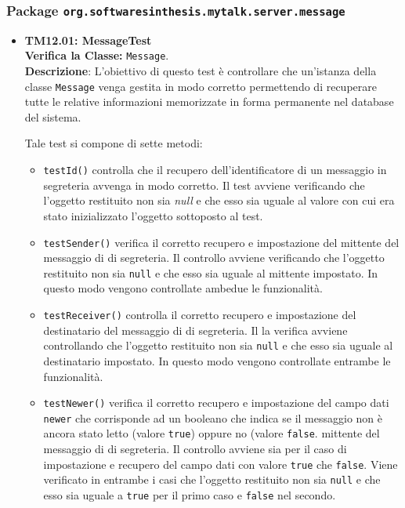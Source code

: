 \subsubsection{Package \texttt{org.softwaresinthesis.mytalk.server.message}}
\begin{itemize}

\item \textbf{TM12.01: MessageTest}\\
\textbf{Verifica la Classe:} \texttt{Message}.\\
\textbf{Descrizione}: L'obiettivo di questo test è controllare che un'istanza della classe  \texttt{Message} venga gestita in modo corretto permettendo di recuperare tutte le relative informazioni memorizzate in forma permanente nel database del sistema.

Tale test si compone di sette metodi:
\begin{itemize}
\item \texttt{testId()} controlla che il recupero dell'identificatore di un messaggio in segreteria avvenga in modo corretto. 
Il test avviene verificando che l'oggetto restituito non sia \textit{null} e che esso sia uguale al valore con cui era stato inizializzato l'oggetto sottoposto al test.
\item \texttt{testSender()} verifica il corretto recupero e impostazione del mittente del messaggio di di segreteria.
Il controllo avviene verificando che l'oggetto restituito non sia \texttt{null} e che esso sia uguale al mittente impostato. In questo modo vengono controllate ambedue le funzionalità.
\item \texttt{testReceiver()} controlla il corretto recupero e impostazione del destinatario del messaggio di di segreteria.
Il la verifica avviene controllando che l'oggetto restituito non sia \texttt{null} e che esso sia uguale al destinatario impostato. In questo modo vengono controllate entrambe le funzionalità. 

\item \texttt{testNewer()} verifica il corretto recupero e impostazione del campo dati \texttt{newer} che corrisponde ad un booleano che indica se il messaggio non è ancora stato letto (valore \texttt{true}) oppure no (valore \texttt{false}.  mittente del messaggio di di segreteria.
Il controllo avviene sia per il caso di impostazione e recupero del campo dati con valore 	\texttt{true} che 	\texttt{false}. Viene verificato in entrambe i casi che l'oggetto restituito non sia \texttt{null} e che esso sia uguale a \texttt{true} per il primo caso e \texttt{false} nel secondo.


\end{itemize}
\end{itemize}

